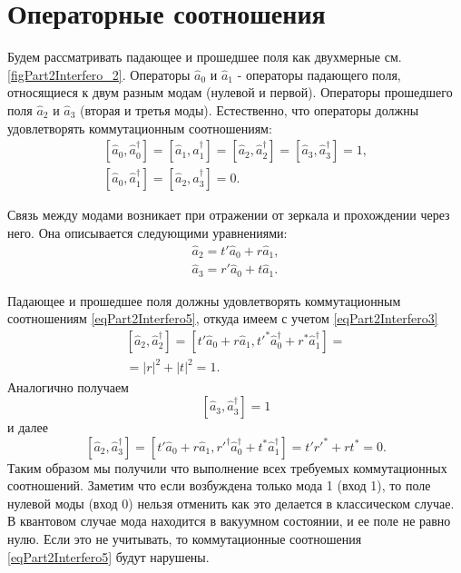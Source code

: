 \section{Операторные соотношения}
Будем рассматривать падающее и прошедшее поля как двухмерные
см. \autoref{figPart2Interfero_2}. Операторы $\hat{a}_0$ и 
$\hat{a}_1$ - операторы падающего поля, относящиеся к двум разным модам
(нулевой и первой). Операторы прошедшего поля $\hat{a}_2$ и 
$\hat{a}_3$ (вторая и третья моды). Естественно, что операторы должны
удовлетворять коммутационным соотношениям:
\begin{eqnarray}
\left[\hat{a}_0, \hat{a}_0^{\dag}\right] = 
\left[\hat{a}_1, \hat{a}_1^{\dag}\right] = 
\left[\hat{a}_2, \hat{a}_2^{\dag}\right] = 
\left[\hat{a}_3, \hat{a}_3^{\dag}\right] = 1,
\nonumber \\
\left[\hat{a}_0, \hat{a}_1^{\dag}\right] = 
\left[\hat{a}_2, \hat{a}_3^{\dag}\right] = 0.
\label{eqPart2Interfero5}
\end{eqnarray}



Связь между модами возникает при отражении от зеркала и прохождении
через него. Она описывается следующими уравнениями:
\begin{eqnarray}
\hat{a}_2 = t' \hat{a}_0 + r \hat{a}_1,
\nonumber \\
\hat{a}_3 = r' \hat{a}_0 + t \hat{a}_1.
\label{eqPart2Interfero6}
\end{eqnarray}

Падающее и прошедшее поля должны удовлетворять коммутационным
соотношениям \eqref{eqPart2Interfero5}, откуда имеем  с учетом 
\eqref{eqPart2Interfero3}
\begin{eqnarray}
\left[\hat{a}_2, \hat{a}_2^{\dag}\right] = 
\left[t' \hat{a}_0 + r \hat{a}_1, t'^{*} \hat{a}_0^{\dag} + r^{*}
  \hat{a}_1^{\dag}\right] =
\nonumber \\ = 
\left|r\right|^2 + \left|t\right|^2 = 1.
\label{eqPart2InterferoTask2a}
\end{eqnarray}
Аналогично получаем 
\begin{equation}
\left[\hat{a}_3, \hat{a}_3^{\dag}\right] = 1 
\label{eqPart2InterferoTask2b}
\end{equation}
и далее
\begin{equation}
\left[\hat{a}_2, \hat{a}_3^{\dag}\right] = 
\left[t' \hat{a}_0 + r \hat{a}_1, 
r'^{\dag} \hat{a}_0^{\dag} + t^{*} \hat{a}_1^{\dag}\right] = 
t' r'^{*} + r t^{*} = 0.
\label{eqPart2InterferoTask2c}
\end{equation}
Таким образом мы получили что выполнение всех требуемых коммутационных
соотношений. Заметим что если возбуждена только мода 1 (вход 1), то
поле нулевой моды (вход 0) нельзя отменить как это делается в
классическом случае. В квантовом случае мода находится в вакуумном
состоянии, и ее поле не равно нулю. Если это не учитывать, то
коммутационные соотношения \eqref{eqPart2Interfero5} будут нарушены.

